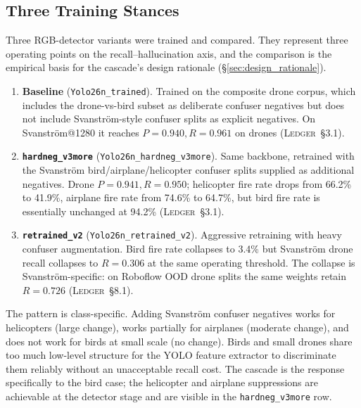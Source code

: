 \documentclass[12pt,a4paper,oneside,openright]{book}
\begin{document}
\subsection{Three Training Stances}
\label{sec:rgb_three_variants}

Three RGB-detector variants were trained and compared. They represent three operating points on the recall--hallucination axis, and the comparison is the empirical basis for the cascade's design rationale (\S\ref{sec:design_rationale}).

\begin{enumerate}
    \item \textbf{Baseline} (\texttt{Yolo26n\_trained}). Trained on the composite drone corpus, which includes the drone-vs-bird subset as deliberate confuser negatives but does not include Svanstr\"om-style confuser splits as explicit negatives. On Svanstr\"om@1280 it reaches $P=0.940, R=0.961$ on drones (\textsc{Ledger}~\S3.1).
    \item \textbf{\texttt{hardneg\_v3more}} (\texttt{Yolo26n\_hardneg\_v3more}). Same backbone, retrained with the Svanstr\"om bird/airplane/helicopter confuser splits supplied as additional negatives. Drone $P=0.941, R=0.950$; helicopter fire rate drops from 66.2\% to 41.9\%, airplane fire rate from 74.6\% to 64.7\%, but bird fire rate is essentially unchanged at 94.2\% (\textsc{Ledger}~\S3.1).
    \item \textbf{\texttt{retrained\_v2}} (\texttt{Yolo26n\_retrained\_v2}). Aggressive retraining with heavy confuser augmentation. Bird fire rate collapses to 3.4\% but Svanstr\"om drone recall collapses to $R=0.306$ at the same operating threshold. The collapse is Svanstr\"om-specific: on Roboflow OOD drone splits the same weights retain $R=0.726$ (\textsc{Ledger}~\S8.1).
\end{enumerate}

The pattern is class-specific. Adding Svanstr\"om confuser negatives works for helicopters (large change), works partially for airplanes (moderate change), and does not work for birds at small scale (no change). Birds and small drones share too much low-level structure for the YOLO feature extractor to discriminate them reliably without an unacceptable recall cost. The cascade is the response specifically to the bird case; the helicopter and airplane suppressions are achievable at the detector stage and are visible in the \texttt{hardneg\_v3more} row.
\end{document}
